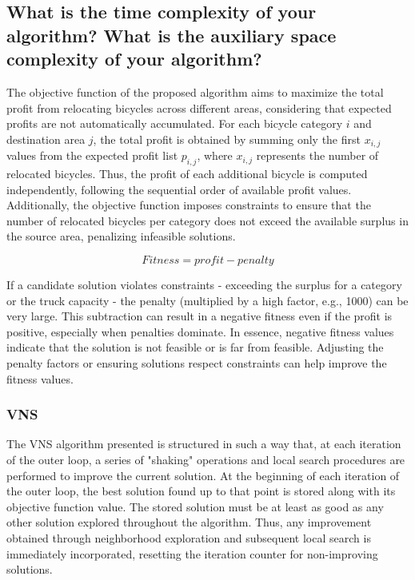 \documentclass{article}
\begin{document}
	
	\subsection{What is the time complexity of your algorithm? What is the auxiliary space complexity of your algorithm?}
	
	The objective function of the proposed algorithm aims to maximize the total profit from relocating bicycles across different areas, considering that expected profits are not automatically accumulated. For each bicycle category $i$ and destination area $j$, the total profit is obtained by summing only the first $x_{i,j}$ values from the expected profit list $p_{i,j}$, where $x_{i,j}$ represents the number of relocated bicycles. Thus, the profit of each additional bicycle is computed independently, following the sequential order of available profit values. Additionally, the objective function imposes constraints to ensure that the number of relocated bicycles per category does not exceed the available surplus in the source area, penalizing infeasible solutions.
	
	\begin{equation}
		Fitness = profit - penalty
	\end{equation}
	
	If a candidate solution violates constraints - exceeding the surplus for a category or the truck capacity - the penalty (multiplied by a high factor, e.g., 1000) can be very large. This subtraction can result in a negative fitness even if the profit is positive, especially when penalties dominate. In essence, negative fitness values indicate that the solution is not feasible or is far from feasible. Adjusting the penalty factors or ensuring solutions respect constraints can help improve the fitness values.
	
	
	
	\subsubsection{VNS}
	The VNS algorithm presented is structured in such a way that, at each iteration of the outer loop, a series of "shaking" operations and local search procedures are performed to improve the current solution. At the beginning of each iteration of the outer loop, the best solution found up to that point is stored along with its objective function value. The stored solution must be at least as good as any other solution explored throughout the algorithm. Thus, any improvement obtained through neighborhood exploration and subsequent local search is immediately incorporated, resetting the iteration counter for non-improving solutions.
	
\end{document}
